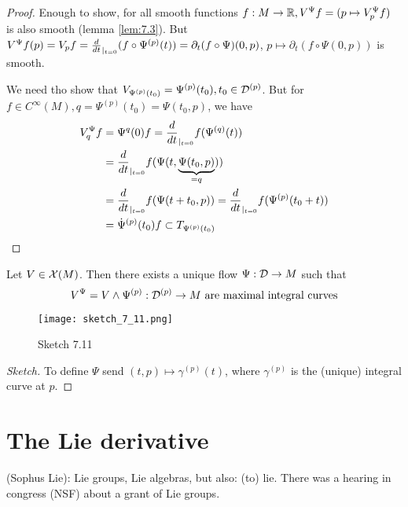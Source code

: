 \begin{proof}
     Enough to show, for all smooth functions \(f:M\to \mathbb{R}, V^\Psi f=(p\mapsto V_p^\Psi f)\) is also smooth (lemma \ref{lem:7.3}).
    But \(V^\Psi f(p)=V_p f=\frac{d}{dt}_{|_{t=0}}(f\circ \Psi^{(p)}(t))=\partial_t (f\circ \Psi)(0,p)\), \(p\mapsto \partial_t(f\circ \Psi(0,p))\) is smooth.

     We need tho show that \(V_{\Psi^{(p)}(t_0)}=\Psi^{(p)}(t_0),t_0\in\mathcal{D}^{(p)}\).
    But for \(f\in C^\infty(M),q=\Psi^{(p)}(t_0)=\Psi(t_0,p)\), we have 
    \begin{align*}
        V_q^{\Psi} f&=\Psi^{q}(0)f=\frac{d}{dt}_{|_{t=0}}f(\Psi^{(q)}(t))\\
        &=\frac{d}{dt}_{|_{t=0}}f(\Psi(t,\underbrace{\Psi(t_0,p)}_{=q}))\\
        &=\frac{d}{dt}_{|_{t=0}} f(\Psi(t+t_0,p))=\frac{d}{dt}_{|_{t=0}}f(\Psi^{(p)}(t_0+t))\\
        &=\dot{\Psi}^{(p)}(t_0)f\subset T_{\Psi^{(p)}(t_0)}  
    \end{align*}

\end{proof}


\begin{theorem}\label{thm:7.12}
    Let \(V\in \mathcal{X}(M)\). Then there exists a unique flow \(\Psi:\mathcal{D}\to M\) such that 
    \[V^{\Psi}=V\land\Psi^{(p)}:\mathcal{D}^{(p)}\to M \text{ are maximal integral curves}\]
    \begin{figure}[H]\label{fig:7.11}
        \centering
        \texttt{[image: sketch\_7\_11.png]}
        \caption{Sketch 7.11}
    \end{figure}
\end{theorem}

\begin{proof}[Sketch]
    To define \(\Psi\) send \((t,p)\mapsto \gamma^{(p)}(t)\), where \(\gamma^{(p)}\) is the (unique) 
    integral curve at \(p\).
\end{proof}

\section{The Lie derivative}

 (Sophus Lie): Lie groups, Lie algebras, but also: (to) lie. There was a hearing in congress (NSF)
about a grant of Lie groups.

